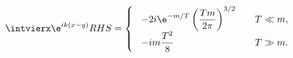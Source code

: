 \begin{equation}
\label{eq:wt2_rhs}
\intvierx \e^{ik(x-y)}  RHS = \left\{\ \begin{array}{ll}
 -2i\e^{-m/T}\left(\dfrac{Tm}{2\pi}\right)^{3/2} &\quad T\ll m,\\
 -im\dfrac{T^2}{8}&\quad T\gg m.  \end{array} \right. 
\end{equation}

